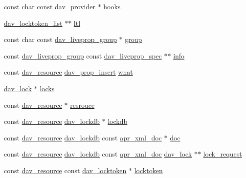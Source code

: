 \begin{DoxyCompactItemize}
const char const \hyperlink{structdav__provider}{dav\+\_\+provider} $\ast$ \hyperlink{group__MOD__DAV_ga2f89c7cfd67d24769756d6d2df79bf5c}{hooks}
\item 
\hyperlink{structdav__locktoken__list}{dav\+\_\+locktoken\+\_\+list} $\ast$$\ast$ \hyperlink{group__MOD__DAV_gae93a71ee2894bbcd0b2a5e997a7abcb1}{ltl}
\item 
const char const \hyperlink{structdav__liveprop__group}{dav\+\_\+liveprop\+\_\+group} $\ast$ \hyperlink{group__MOD__DAV_gadc3add9d56a1a732c371606682db4c4e}{group}
\item 
const \hyperlink{structdav__liveprop__group}{dav\+\_\+liveprop\+\_\+group} const \hyperlink{structdav__liveprop__spec}{dav\+\_\+liveprop\+\_\+spec} $\ast$$\ast$ \hyperlink{group__MOD__DAV_ga533561439682bae03f90d9e96eb1d30b}{info}
\item 
const \hyperlink{structdav__resource}{dav\+\_\+resource} \hyperlink{group__MOD__DAV_ga4c0cd73bce52d0eda981ce54973f27af}{dav\+\_\+prop\+\_\+insert} \hyperlink{group__MOD__DAV_ga2a369f77672da2ad7391991461733e6c}{what}
\item 
\hyperlink{structdav__lock}{dav\+\_\+lock} $\ast$ \hyperlink{group__MOD__DAV_ga3d3cc325e4516ee89b4f0890dba7514e}{locks}
\item 
const \hyperlink{structdav__resource}{dav\+\_\+resource} $\ast$ \hyperlink{group__MOD__DAV_ga8ea0b6c91d5216eba86c4c0a7a66bef7}{resrouce}
\item 
const \hyperlink{structdav__resource}{dav\+\_\+resource} \hyperlink{structdav__lockdb}{dav\+\_\+lockdb} $\ast$ \hyperlink{group__MOD__DAV_ga4d2e2ae951dbf7731ef129422cb95674}{lockdb}
\item 
const \hyperlink{structdav__resource}{dav\+\_\+resource} \hyperlink{structdav__lockdb}{dav\+\_\+lockdb} const \hyperlink{structapr__xml__doc}{apr\+\_\+xml\+\_\+doc} $\ast$ \hyperlink{group__MOD__DAV_gab79aad8aa27988a0e86b9397d43541e8}{doc}
\item 
const \hyperlink{structdav__resource}{dav\+\_\+resource} \hyperlink{structdav__lockdb}{dav\+\_\+lockdb} const \hyperlink{structapr__xml__doc}{apr\+\_\+xml\+\_\+doc} \hyperlink{structdav__lock}{dav\+\_\+lock} $\ast$$\ast$ \hyperlink{group__MOD__DAV_gab4436a0928746b4d531ca686d2a0c0bf}{lock\+\_\+request}
\item 
const \hyperlink{structdav__resource}{dav\+\_\+resource} const \hyperlink{structdav__locktoken}{dav\+\_\+locktoken} $\ast$ \hyperlink{group__MOD__DAV_gaa2478c643fbd5d72dc6c31696dfc6a03}{locktoken}
\item 
$$
\end{DoxyCompactItemize}
